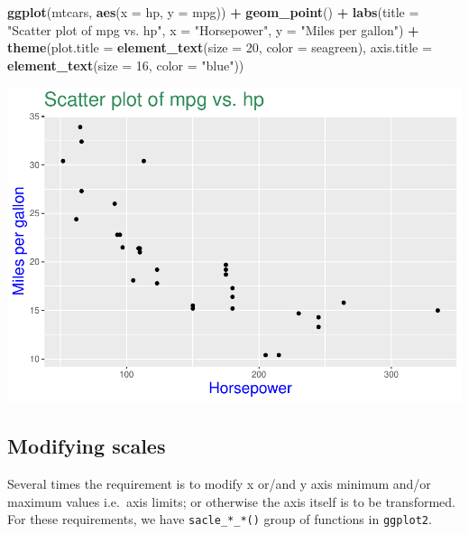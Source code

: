 \documentclass[
]{book}
\newenvironment{Shaded}{\begin{snugshade}}{\end{snugshade}}
\newcommand{\AttributeTok}[1]{\textcolor[rgb]{0.13,0.29,0.53}{#1}}
\newcommand{\DecValTok}[1]{\textcolor[rgb]{0.00,0.00,0.81}{#1}}
\newcommand{\FunctionTok}[1]{\textcolor[rgb]{0.13,0.29,0.53}{\textbf{#1}}}
\newcommand{\NormalTok}[1]{#1}
\newcommand{\SpecialCharTok}[1]{\textcolor[rgb]{0.81,0.36,0.00}{\textbf{#1}}}
\newcommand{\StringTok}[1]{\textcolor[rgb]{0.31,0.60,0.02}{#1}}
\begin{document}
\begin{Shaded}
\begin{Highlighting}[]
\FunctionTok{ggplot}\NormalTok{(mtcars, }\FunctionTok{aes}\NormalTok{(}\AttributeTok{x =}\NormalTok{ hp, }\AttributeTok{y =}\NormalTok{ mpg)) }\SpecialCharTok{+}
  \FunctionTok{geom\_point}\NormalTok{() }\SpecialCharTok{+}
  \FunctionTok{labs}\NormalTok{(}\AttributeTok{title =} \StringTok{"Scatter plot of mpg vs. hp"}\NormalTok{,}
       \AttributeTok{x =} \StringTok{"Horsepower"}\NormalTok{,}
       \AttributeTok{y =} \StringTok{"Miles per gallon"}\NormalTok{) }\SpecialCharTok{+}
  \FunctionTok{theme}\NormalTok{(}\AttributeTok{plot.title =} \FunctionTok{element\_text}\NormalTok{(}\AttributeTok{size =} \DecValTok{20}\NormalTok{, }\AttributeTok{color =} \StringTok{\textquotesingle{}seagreen\textquotesingle{}}\NormalTok{),}
        \AttributeTok{axis.title =} \FunctionTok{element\_text}\NormalTok{(}\AttributeTok{size =} \DecValTok{16}\NormalTok{, }\AttributeTok{color =} \StringTok{"blue"}\NormalTok{))}
\end{Highlighting}
\end{Shaded}

\includegraphics{DauR_files/figure-latex/unnamed-chunk-215-1.pdf}

\hypertarget{modifying-scales}{%
\subsection{Modifying scales}\label{modifying-scales}}

Several times the requirement is to modify x or/and y axis minimum and/or maximum values i.e.~axis limits; or otherwise the axis itself is to be transformed. For these requirements, we have \texttt{sacle\_*\_*()} group of functions in \texttt{ggplot2}.
\end{document}
